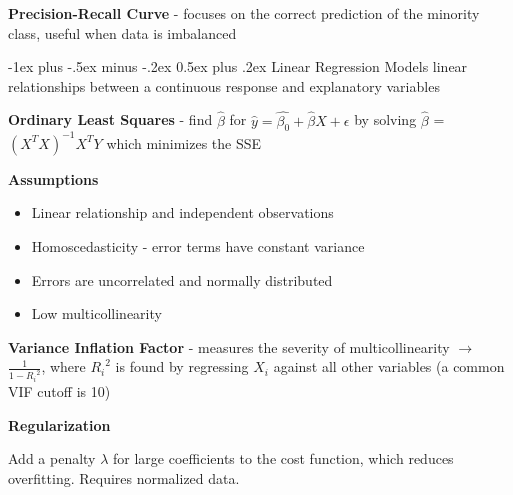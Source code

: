\documentclass[10pt,landscape]{article}
\makeatletter
\renewcommand{\section}{\@startsection{section}{1}{0mm}%
                                {-1ex plus -.5ex minus -.2ex}%
                                {0.5ex plus .2ex}%
                                {\normalfont\large\bfseries}}
\makeatother
\begin{document}
\begin{multicols}{3}
    \textbf{Precision-Recall Curve} - focuses on the correct prediction of the minority class, useful when data is imbalanced

    \section{Linear Regression}
    Models linear relationships between a continuous response and explanatory variables

    \textbf{Ordinary Least Squares} - find $\hat{\beta}$ for $\hat{y} = \hat{\beta_{0}} + \hat{\beta}X + \epsilon$
    by solving $\hat{\beta}$ = $(X^{T}X)^{-1}X^{T}Y$ which minimizes the SSE

    \textbf{Assumptions}
    \begin{itemize}[label={--},leftmargin=4mm]
        \vspace{-1mm}
        \itemsep -.4mm
        \item Linear relationship and independent observations
        \item Homoscedasticity - error terms have constant variance
        \item Errors are uncorrelated and normally distributed
        \item Low multicollinearity
    \end{itemize}

    \textbf{Variance Inflation Factor} - measures the severity of multicollinearity $\to$ $\frac{1}{1-{R_i}^2}$, where ${R_i}^2$ is found by regressing $X_i$ against all other variables (a common VIF cutoff is 10)

    \textbf{Regularization}

    Add a penalty $\lambda$ for large coefficients to the cost function, which reduces overfitting. Requires normalized data.


\end{multicols}
\end{document}
